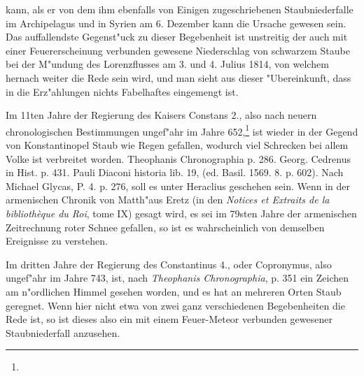 \documentclass[a4paper, 11pt, oneside, polutonikogreek, german]{article}
\begin{document}
kann, als er von dem ihm ebenfalls von Einigen zugeschriebenen Staubniederfalle im Archipelagus und in Syrien am 6. Dezember kann die Ursache gewesen sein. Das auffallendste Gegenst"uck zu dieser Begebenheit ist unstreitig der auch mit einer Feuererscheinung verbunden gewesene Niederschlag von schwarzem Staube bei der M"undung des Lorenzflusses am 3. und 4. Julius 1814, von welchem hernach weiter die Rede sein wird, und man sieht aus dieser "Ubereinkunft, dass in die Erz"ahlungen nichts Fabelhaftes eingemengt ist.

Im 11ten Jahre der Regierung des Kaisers Constans 2., also nach neuern chronologischen Bestimmungen ungef"ahr im Jahre 652,\footnote{} ist wieder in der Gegend von Konstantinopel Staub wie Regen gefallen, wodurch viel Schrecken bei allem Volke ist verbreitet worden. Theophanis Chronographia p. 286. Georg. Cedrenus in Hist. p. 431. Pauli Diaconi historia lib. 19, (ed. Basil. 1569. 8. p. 602). Nach Michael Glycas, P. 4. p. 276, soll es unter Heraclius geschehen sein. Wenn in der armenischen Chronik von Matth"aus Eretz (in den \emph{Notices et Extraits de la bibliothèque du Roi}, tome IX) gesagt wird, es sei im 79sten Jahre der armenischen Zeitrechnung roter Schnee gefallen, so ist es wahrscheinlich von demselben Ereignisse zu verstehen.

Im dritten Jahre der Regierung des Constantinus 4., oder Copronymus, also ungef"ahr im Jahre 743, ist, nach \emph{Theophanis Chronographia}, p. 351 ein Zeichen am n"ordlichen Himmel gesehen worden, und es hat an mehreren Orten Staub geregnet. Wenn hier nicht etwa von zwei ganz verschiedenen Begebenheiten die Rede ist, so ist dieses also ein mit einem Feuer-Meteor verbunden gewesener Staubniederfall anzusehen.
\end{document}
